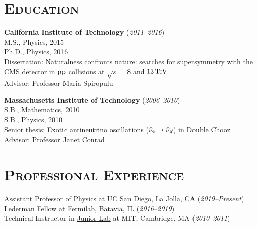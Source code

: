 \documentclass[11pt]{res}
\newcommand{\MarginText}[1]{\section{\textsc{#1}}\vspace{10pt}}
\begin{document}
\begin{resume}


\MarginText{Education}

\textbf{California Institute of Technology} (\textit{2011--2016})\\
M.S., Physics, 2015\\
Ph.D., Physics, 2016\\
Dissertation:
    \href{https://doi.org/10.7907/Z9GX48JV}{Naturalness
        confronts nature: searches for supersymmetry with the CMS
        detector in $\mathrm{p}\mathrm{p}$ collisions at $\sqrt{s} = 8$ and $13\,\text{Te\hspace{-.08em}V}$}\\
Advisor: Professor Maria Spiropulu

\textbf{Massachusetts Institute of Technology} (\textit{2006--2010})\\
S.B., Mathematics, 2010\\
S.B., Physics, 2010\\
Senior thesis: \href{http://hdl.handle.net/1721.1/61255}{Exotic antineutrino oscillations
  ($\bar\nu_\Pe\to\bar\nu_{\slashed{\Pe}}$) in Double Chooz}\\
Advisor: Professor Janet Conrad



\MarginText{Professional Experience}
Assistant Professor of Physics at UC San Diego, La Jolla, CA (\textit{2019--Present})\\
\href{http://www.fnal.gov/pub/forphysicists/fellowships/leon_lederman/index.html}{Lederman
  Fellow} at Fermilab, Batavia, IL (\textit{2016--2019})\\
Technical Instructor in
\href{http://web.mit.edu/8.13/www/index.shtml}{Junior Lab} at MIT, Cambridge, MA (\textit{2010--2011})



\end{resume}
\end{document}

